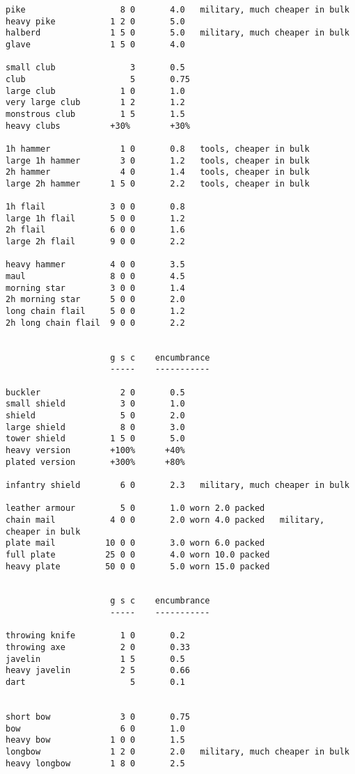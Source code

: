 \begin{verbatim}
pike                   8 0       4.0   military, much cheaper in bulk
heavy pike           1 2 0       5.0
halberd              1 5 0       5.0   military, much cheaper in bulk
glave                1 5 0       4.0

small club               3       0.5
club                     5       0.75
large club             1 0       1.0
very large club        1 2       1.2
monstrous club         1 5       1.5
heavy clubs          +30%        +30%

1h hammer              1 0       0.8   tools, cheaper in bulk
large 1h hammer        3 0       1.2   tools, cheaper in bulk
2h hammer              4 0       1.4   tools, cheaper in bulk
large 2h hammer      1 5 0       2.2   tools, cheaper in bulk

1h flail             3 0 0       0.8
large 1h flail       5 0 0       1.2
2h flail             6 0 0       1.6
large 2h flail       9 0 0       2.2

heavy hammer         4 0 0       3.5
maul                 8 0 0       4.5
morning star         3 0 0       1.4
2h morning star      5 0 0       2.0
long chain flail     5 0 0       1.2
2h long chain flail  9 0 0       2.2


                     g s c    encumbrance
                     -----    -----------

buckler                2 0       0.5
small shield           3 0       1.0
shield                 5 0       2.0
large shield           8 0       3.0
tower shield         1 5 0       5.0
heavy version        +100%      +40%
plated version       +300%      +80%

infantry shield        6 0       2.3   military, much cheaper in bulk

leather armour         5 0       1.0 worn 2.0 packed
chain mail           4 0 0       2.0 worn 4.0 packed   military, cheaper in bulk
plate mail          10 0 0       3.0 worn 6.0 packed
full plate          25 0 0       4.0 worn 10.0 packed
heavy plate         50 0 0       5.0 worn 15.0 packed


                     g s c    encumbrance
                     -----    -----------

throwing knife         1 0       0.2
throwing axe           2 0       0.33
javelin                1 5       0.5
heavy javelin          2 5       0.66
dart                     5       0.1


short bow              3 0       0.75
bow                    6 0       1.0
heavy bow            1 0 0       1.5
longbow              1 2 0       2.0   military, much cheaper in bulk
heavy longbow        1 8 0       2.5


\end{verbatim}
